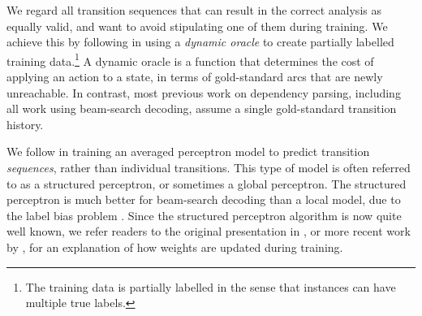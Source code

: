 \documentclass[11pt,letterpaper]{article}
\begin{document}
We regard all transition sequences that can result in the correct analysis as
equally valid, and want to avoid stipulating one of them during training.  
We achieve this by following \citet{goldberg:12} in using a
\emph{dynamic oracle} to create partially labelled training data.\footnote{
The training data is partially labelled in the sense that instances can have multiple
true labels.}
A dynamic oracle is a function that determines the cost of applying an
action to a state, in terms of gold-standard arcs that are newly unreachable.
In contrast, most previous work on dependency parsing, including all work using
beam-search decoding, assume a single gold-standard transition history.

We follow \citet{collins:02} in training an averaged perceptron model to predict
transition \emph{sequences}, rather than individual transitions.  This type of model
is often referred to as a structured perceptron, or sometimes a global perceptron.
The structured perceptron is much better for beam-search decoding than a local
model, due to the label bias problem \citep{zhang:12}.
Since the structured perceptron algorithm is now quite well known, we refer
readers to the original presentation in \citet{collins:02}, or more recent work
by \citet{huang:12}, for an explanation of how weights are updated during training.


\end{document}
